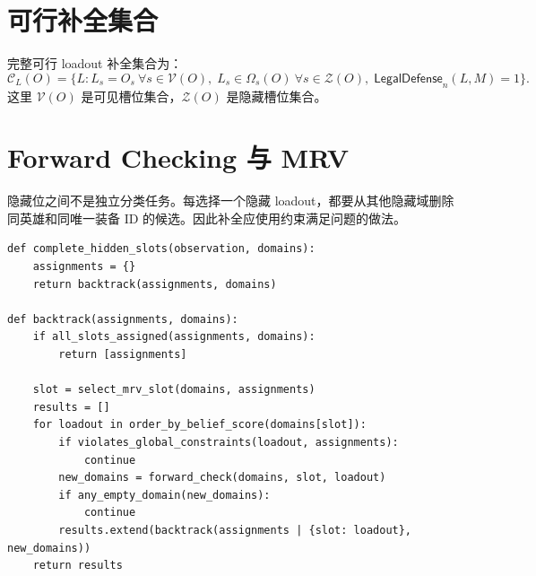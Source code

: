 \documentclass[UTF8,12pt,openany]{ctexbook}
\newcommand{\Ccal}{\mathcal{C}}
\newcommand{\LegalDefense}{\mathsf{LegalDefense}}
\begin{document}
\section{可行补全集合}
完整可行 loadout 补全集合为：
\begin{equation}
\Ccal_L(O)=\{L: L_s=O_s\ \forall s\in\mathcal{V}(O),\; L_s\in\Omega_s(O)\ \forall s\in\mathcal{Z}(O),\; \LegalDefense_n(L,M)=1\}.
\end{equation}
这里 $\mathcal{V}(O)$ 是可见槽位集合，$\mathcal{Z}(O)$ 是隐藏槽位集合。

\section{Forward Checking 与 MRV}
隐藏位之间不是独立分类任务。每选择一个隐藏 loadout，都要从其他隐藏域删除同英雄和同唯一装备 ID 的候选。因此补全应使用约束满足问题的做法。

\begin{lstlisting}[caption={隐藏补全的约束传播伪代码}]
def complete_hidden_slots(observation, domains):
    assignments = {}
    return backtrack(assignments, domains)

def backtrack(assignments, domains):
    if all_slots_assigned(assignments, domains):
        return [assignments]

    slot = select_mrv_slot(domains, assignments)
    results = []
    for loadout in order_by_belief_score(domains[slot]):
        if violates_global_constraints(loadout, assignments):
            continue
        new_domains = forward_check(domains, slot, loadout)
        if any_empty_domain(new_domains):
            continue
        results.extend(backtrack(assignments | {slot: loadout}, new_domains))
    return results
\end{lstlisting}
\end{document}

